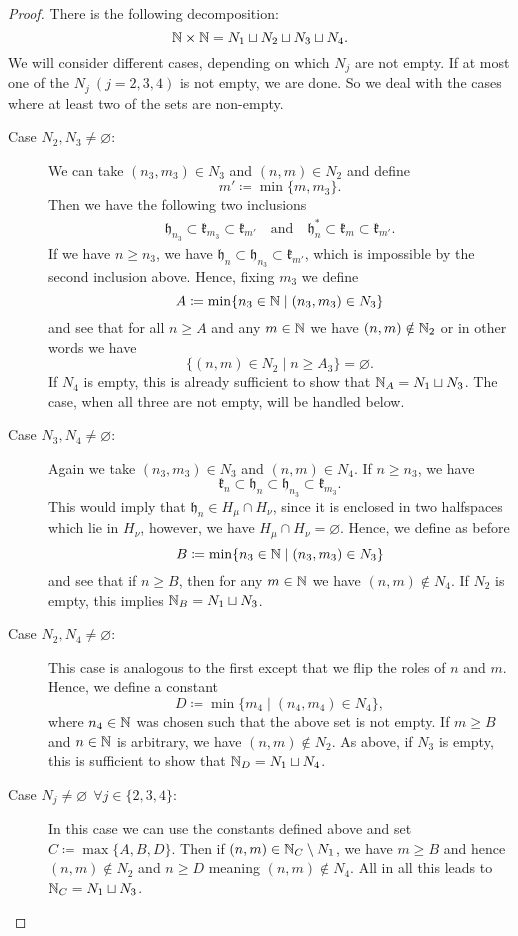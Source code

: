 \begin{proof}
  There is the following decomposition:
  \[
    \mathbb{N} \times \mathbb{N} = N_1 \sqcup N_2 \sqcup N_3 \sqcup N_4.
  \] 
  We will consider different cases, depending on which \(N_j\) are not empty. If at most one of the \(N_j\ (j = 2,3,4)\)  is not empty, we are done. So we deal with the cases where at least two of the sets are non-empty.
  \begin{description}
  \item[Case \(N_2, N_3 \neq \varnothing\):] We can take \((n_3, m_3) \in N_3\) and \((n,m) \in N_2\) and define
    \[
      m' \coloneqq \min\{m, m_3\}.
    \]
    Then we have the following two inclusions
    \begin{align*}
      \mathfrak{h}_{n_3} \subset \mathfrak{k}_{m_3} \subset \mathfrak{k}_{m'} \quad \text{and}\quad \mathfrak{h}_{n}^\ast \subset \mathfrak{k}_m \subset \mathfrak{k}_{m'}.
    \end{align*}
    If we have \(n \geq n_3\), we have \(\mathfrak{h}_n \subset \mathfrak{h}_{n_3} \subset \mathfrak{k}_{m'}\), which is impossible by the second inclusion above. Hence, fixing \(m_3\) we define
    \[
      A \coloneqq \min \{n_3 \in \mathbb{N} \mid (n_3, m_3) \in N_3\}
    \]
    and see that for all \(n \geq A\) and any \(m \in \mathbb{N}\) we have \((n,m) \notin \mathbb{N}_2\) or in other words we have
    \[
      \{(n,m) \in N_2 \mid n \geq A_3\} = \varnothing.
    \]
    If \(N_4\) is empty, this is already sufficient to show that \(\mathbb{N}_A = N_1 \sqcup N_3\). The case, when all three are not empty, will be handled below.
  \item[Case \(N_3,N_4 \neq \varnothing\):] Again we take \((n_3, m_3) \in N_3\) and \((n,m) \in N_4\). If \(n \geq n_3\), we have
    \[
      \mathfrak{k}_n \subset \mathfrak{h}_n \subset \mathfrak{h}_{n_3} \subset \mathfrak{k}_{m_3}.
    \]
    This would imply that \(\mathfrak{h}_n \in H_\mu \cap H_\nu\), since it is enclosed in two halfspaces which lie in \(H_\nu\), however, we have \(H_\mu \cap H_\nu = \varnothing\). Hence, we define as before
    \[
      B \coloneqq \min \{n_3 \in \mathbb{N} \mid (n_3, m_3) \in N_3\}
    \]
    and see that if \(n \geq B\), then for any \(m \in \mathbb{N}\) we have \((n,m) \notin N_4\). If \(N_2\) is empty, this implies \(\mathbb{N}_B = N_1 \sqcup N_3\).
  \item[Case \(N_2,N_4 \neq \varnothing\):] This case is analogous to the first except that we flip the roles of \(n\) and \(m\). Hence, we define a constant
    \[
      D \coloneqq \min \{m_4 \mid (n_4, m_4) \in N_4\},
    \]
    where \(n_4 \in \mathbb{N}\) was chosen such that the above set is not empty. If \(m \geq B\) and \(n \in \mathbb{N}\) is arbitrary, we have \((n, m) \notin N_2\). As above, if \(N_3 \) is empty, this is sufficient to show that \(\mathbb{N}_D = N_1 \sqcup N_4\).
  \item[Case \(N_j \neq \varnothing\ \ \forall j \in\{2,3,4\}\):] In this case we can use the constants defined above and set \(C \coloneqq \max \{A,B,D\}\). Then if \((n,m) \in \mathbb{N}_C \setminus N_1\), we have \(m \geq B\) and hence \((n,m) \notin N_2\) and \(n \geq D\) meaning \((n,m) \notin N_4\). All in all this leads to \(\mathbb{N}_C = N_1 \sqcup N_3\).
  \end{description}
\end{proof}

